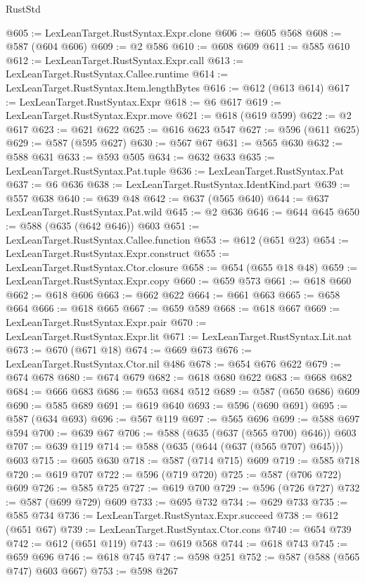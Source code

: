 \begin{lexlean}{RustStd}
\begin{coremodule}
@605 := LexLeanTarget.RustSyntax.Expr.clone
@606 := @605 @568
@608 := @587 (@604 @606)
@609 := @2 @586
@610 := @608 @609
@611 := @585 @610
@612 := LexLeanTarget.RustSyntax.Expr.call
@613 := LexLeanTarget.RustSyntax.Callee.runtime
@614 := LexLeanTarget.RustSyntax.Item.lengthBytes
@616 := @612 (@613 @614)
@617 := LexLeanTarget.RustSyntax.Expr
@618 := @6 @617
@619 := LexLeanTarget.RustSyntax.Expr.move
@621 := @618 (@619 @599)
@622 := @2 @617
@623 := @621 @622
@625 := @616 @623 @547
@627 := @596 (@611 @625)
@629 := @587 (@595 @627)
@630 := @567 @67
@631 := @565 @630
@632 := @588 @631
@633 := @593 @505
@634 := @632 @633
@635 := LexLeanTarget.RustSyntax.Pat.tuple
@636 := LexLeanTarget.RustSyntax.Pat
@637 := @6 @636
@638 := LexLeanTarget.RustSyntax.IdentKind.part
@639 := @557 @638
@640 := @639 @48
@642 := @637 (@565 @640)
@644 := @637 LexLeanTarget.RustSyntax.Pat.wild
@645 := @2 @636
@646 := @644 @645
@650 := @588 (@635 (@642 @646)) @603
@651 := LexLeanTarget.RustSyntax.Callee.function
@653 := @612 (@651 @23)
@654 := LexLeanTarget.RustSyntax.Expr.construct
@655 := LexLeanTarget.RustSyntax.Ctor.closure
@658 := @654 (@655 @18 @48)
@659 := LexLeanTarget.RustSyntax.Expr.copy
@660 := @659 @573
@661 := @618 @660
@662 := @618 @606
@663 := @662 @622
@664 := @661 @663
@665 := @658 @664
@666 := @618 @665
@667 := @659 @589
@668 := @618 @667
@669 := LexLeanTarget.RustSyntax.Expr.pair
@670 := LexLeanTarget.RustSyntax.Expr.lit
@671 := LexLeanTarget.RustSyntax.Lit.nat
@673 := @670 (@671 @18)
@674 := @669 @673
@676 := LexLeanTarget.RustSyntax.Ctor.nil @486
@678 := @654 @676 @622
@679 := @674 @678
@680 := @674 @679
@682 := @618 @680 @622
@683 := @668 @682
@684 := @666 @683
@686 := @653 @684 @512
@689 := @587 (@650 @686) @609
@690 := @585 @689
@691 := @619 @640
@693 := @596 (@690 @691)
@695 := @587 (@634 @693)
@696 := @567 @119
@697 := @565 @696
@699 := @588 @697 @594
@700 := @639 @67
@706 := @588 (@635 (@637 (@565 @700) @646)) @603
@707 := @639 @119
@714 := @588 (@635 (@644 (@637 (@565 @707) @645))) @603
@715 := @605 @630
@718 := @587 (@714 @715) @609
@719 := @585 @718
@720 := @619 @707
@722 := @596 (@719 @720)
@725 := @587 (@706 @722) @609
@726 := @585 @725
@727 := @619 @700
@729 := @596 (@726 @727)
@732 := @587 (@699 @729) @609
@733 := @695 @732
@734 := @629 @733
@735 := @585 @734
@736 := LexLeanTarget.RustSyntax.Expr.succeed
@738 := @612 (@651 @67)
@739 := LexLeanTarget.RustSyntax.Ctor.cons
@740 := @654 @739
@742 := @612 (@651 @119)
@743 := @619 @568
@744 := @618 @743
@745 := @659 @696
@746 := @618 @745
@747 := @598 @251
@752 := @587 (@588 (@565 @747) @603 @667)
@753 := @598 @267

\end{coremodule}
\end{lexlean}
